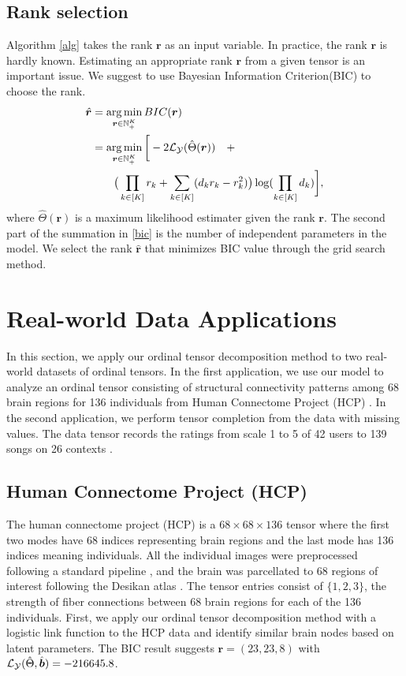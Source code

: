 \documentclass{article}
\theoremstyle{plain}
\theoremstyle{definition}
\begin{document}
\subsection{Rank selection}
Algorithm \ref{alg} takes  the rank $\bm r$ as an input variable. In practice, the rank $\bm r$ is hardly known. Estimating an appropriate rank $\bm r$ from a given tensor is an important issue. We suggest to use Bayesian Information Criterion(BIC) to choose the rank.
\begin{equation}
    \label{bic}
    \begin{aligned}
        \hat{\bm r} &= \operatorname*{arg\,min}_{\bm r\in \mathbb{N}_+^K} BIC(\bm r)\\
        &=\operatorname*{arg\,min}_{\bm r\in \mathbb{N}_+^K}\bigg[-2\mathcal{L}_\mathcal{Y}(\hat\Theta(\bm r)) \quad+
        \\&\qquad\big(\prod_{k\in[K]} r_k+\sum_{k\in[K]}(d_kr_k-r_k^2)\big)\log(\prod_{k\in[K]} d_k)\bigg],
    \end{aligned}
\end{equation}
where $\hat\Theta(\bm r)$ is a maximum likelihood estimater given the rank $\bm r$. The second part of the summation in \eqref{bic} is the number of  independent parameters in the model. We select the rank $\hat{\bm r}$ that minimizes BIC value through the grid search method.
\section{Real-world Data Applications}
In this section, we apply our ordinal tensor decomposition method to two real-world datasets of ordinal tensors. In the first application, we use our model to analyze an ordinal tensor consisting of structural connectivity patterns among 68 brain regions for 136 individuals from Human Connectome Project (HCP) \citep{Geddes2016HumanBM}. In the second application, we perform tensor completion from the data with missing values. The data tensor records the ratings from scale 1 to 5 of 42 users to 139 songs on 26 contexts \citep{Baltrunas2011InCarMusicCM}.
\subsection{Human Connectome Project (HCP)}
The human connectome project (HCP) is a $68\times 68 \times 136$ tensor where the first two modes have 68 indices representing brain regions and the last mode has 136 indices meaning individuals. All the individual images were preprocessed following a standard pipeline \citep{Zhang2018MappingPS}, and the brain was parcellated to 68 regions of interest following the Desikan atlas \citep{Desikan2006AnAL}. The tensor entries consist of $\{1,2,3\}$, the strength of fiber connections between 68 brain regions for each of the 136 individuals. First, we apply our ordinal tensor decomposition method with a logistic link function to the HCP data and identify similar brain nodes based on latent parameters. The BIC result suggests $\bm r = (23,23,8)$  with $\mathcal{L}_\mathcal{Y}(\hat{\Theta},\hat{\bm{b}}) = -216645.8$.
\end{document}
